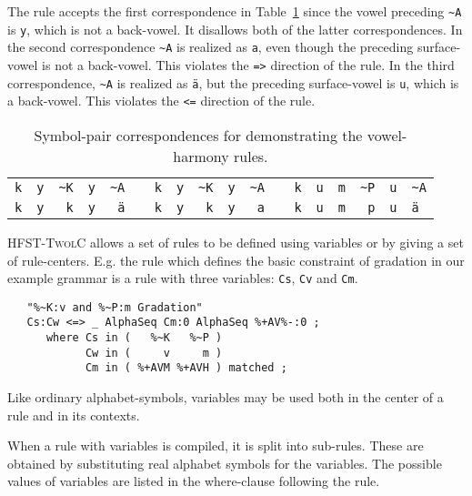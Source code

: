 \documentclass[postprint]{flammie}
\begin{document}
The rule accepts the first correspondence in Table~\ref{cor:1} since
the vowel preceding \verb|~A| is \verb|y|, which is not a
back-vowel. It disallows both of the latter correspondences. In the
second correspondence \verb|~A| is realized as \verb|a|, even though
the preceding surface-vowel is not a back-vowel. This violates the
\verb|=>| direction of the rule. In the third correspondence,
\verb|~A| is realized as \texttt{\"a}, but the preceding
surface-vowel is \verb|u|, which is a back-vowel. This violates the
\verb|<=| direction of the rule.

\begin{table}
  \begin{center}
    \begin{tabular}{|rrrrr|rrrrr|rrrrrr|}
      \hline

      \verb|k| & \verb|y| & \verb|~K| & \verb|y| & \verb|~A | &
      \verb| k| & \verb|y| & \verb|~K| & \verb|y| & \verb|~A | &
      \verb| k| & \verb|u| & \verb|m| & \verb|~P| & \verb|u| &
      \verb|~A|\\

      \verb|k| & \verb|y| & \verb|k| & \verb|y| & \texttt{\"a}\verb| |
      & \verb| k| & \verb|y| & \verb|k| & \verb|y| & \verb|a | &
      \verb| k| & \verb|u| & \verb|m| & \verb|p| & \verb|u| &
      \texttt{\"a}\verb| |\\

      \hline
    \end{tabular}
  \end{center}
  \caption{Symbol-pair correspondences for demonstrating the
  vowel-harmony rules.}\label{cor:1}
\end{table}

\textsc{HFST-TwolC} allows a set of rules to be defined using
variables or by giving a set of rule-centers. E.g. the rule which
defines the basic constraint of gradation in our example grammar is a
rule with three variables: \verb|Cs|, \verb|Cv| and \verb|Cm|.
\begin{verbatim}
   "%~K:v and %~P:m Gradation"
   Cs:Cw <=> _ AlphaSeq Cm:0 AlphaSeq %+AV%-:0 ;
      where Cs in (   %~K   %~P )
            Cw in (     v     m )
            Cm in ( %+AVM %+AVH ) matched ;
\end{verbatim}
Like ordinary alphabet-symbols, variables may be used both in the
center of a rule and in its contexts.
 
When a rule with variables is compiled, it is split into
sub-rules. These are obtained by substituting real alphabet symbols
for the variables. The possible values of variables are listed in the
where-clause following the rule.
\end{document}
